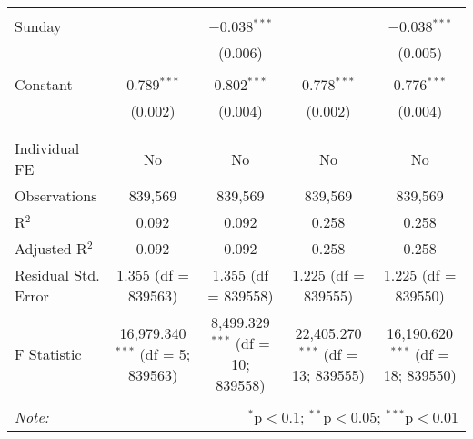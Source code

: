 \documentclass[
]{article}
\begin{document}
\begin{table}[!htbp]
{\begin{tabular}{@{\extracolsep{5pt}}lcccc}
  & & & & \\ 
 Sunday &  & $-$0.038$^{***}$ &  & $-$0.038$^{***}$ \\ 
  &  & (0.006) &  & (0.005) \\ 
  & & & & \\ 
 Constant & 0.789$^{***}$ & 0.802$^{***}$ & 0.778$^{***}$ & 0.776$^{***}$ \\ 
  & (0.002) & (0.004) & (0.002) & (0.004) \\ 
  & & & & \\ 
\hline \\[-1.8ex] 
Individual FE & No & No & No & No \\ 
Observations & 839,569 & 839,569 & 839,569 & 839,569 \\ 
R$^{2}$ & 0.092 & 0.092 & 0.258 & 0.258 \\ 
Adjusted R$^{2}$ & 0.092 & 0.092 & 0.258 & 0.258 \\ 
Residual Std. Error & 1.355 (df = 839563) & 1.355 (df = 839558) & 1.225 (df = 839555) & 1.225 (df = 839550) \\ 
F Statistic & 16,979.340$^{***}$ (df = 5; 839563) & 8,499.329$^{***}$ (df = 10; 839558) & 22,405.270$^{***}$ (df = 13; 839555) & 16,190.620$^{***}$ (df = 18; 839550) \\ 
\hline 
\hline \\[-1.8ex] 
\textit{Note:}  & \multicolumn{4}{r}{$^{*}$p$<$0.1; $^{**}$p$<$0.05; $^{***}$p$<$0.01} \\ 
\end{tabular}
} 
\end{table} 
\newpage
\end{document}
